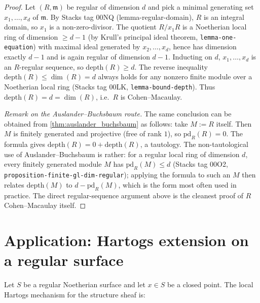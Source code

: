 \begin{proof}
  
  
  
  
  
\leanok
  Let \((R, \mathfrak{m})\) be regular of dimension \(d\) and pick a minimal generating set
  \(x_1, \dots, x_d\) of \(\mathfrak{m}\). By Stacks tag 00NQ (lemma-regular-domain), \(R\) is
  an integral domain, so \(x_1\) is a non-zero-divisor. The quotient \(R/x_1 R\) is a Noetherian
  local ring of dimension \(\geq d - 1\) (by Krull's principal ideal theorem,
  \texttt{lemma-one-equation}) with maximal ideal generated by \(x_2, \dots, x_d\), hence
  has dimension exactly \(d - 1\) and is again regular of dimension \(d - 1\). Inducting on \(d\),
  \(x_1, \dots, x_d\) is an \(R\)-regular sequence, so
  \(\text{depth}(R) \geq d\). The reverse inequality \(\text{depth}(R) \leq \dim(R) = d\)
  always holds for any nonzero finite module over a Noetherian local ring
  (Stacks tag 00LK, \texttt{lemma-bound-depth}). Thus \(\text{depth}(R) = d = \dim(R)\), i.e.\
  \(R\) is Cohen--Macaulay.

  \emph{Remark on the Auslander--Buchsbaum route.} The same conclusion can be obtained from
  \cref{thm:auslander_buchsbaum} as follows: take \(M := R\) itself. Then \(M\) is
  finitely generated and projective (free of rank \(1\)), so \(\text{pd}_R(R) = 0\). The
  formula gives \(\text{depth}(R) = 0 + \text{depth}(R)\), a tautology. The non-tautological
  use of Auslander--Buchsbaum is rather: for a regular local ring of dimension \(d\), every
  finitely generated module \(M\) has \(\text{pd}_R(M) \leq d\) (Stacks tag 00O2,
  \texttt{proposition-finite-gl-dim-regular}); applying the formula to such an \(M\) then
  relates \(\text{depth}(M)\) to \(d - \text{pd}_R(M)\), which is the form most often used in
  practice. The direct regular-sequence argument above is the cleanest proof of
  \(R\) Cohen--Macaulay itself.
\end{proof}

\section{Application: Hartogs extension on a regular surface}
\label{sec:ab_application_to_a4a}

Let \(S\) be a regular Noetherian surface and let \(x \in S\) be a closed point.  The local
Hartogs mechanism for the structure sheaf is:

